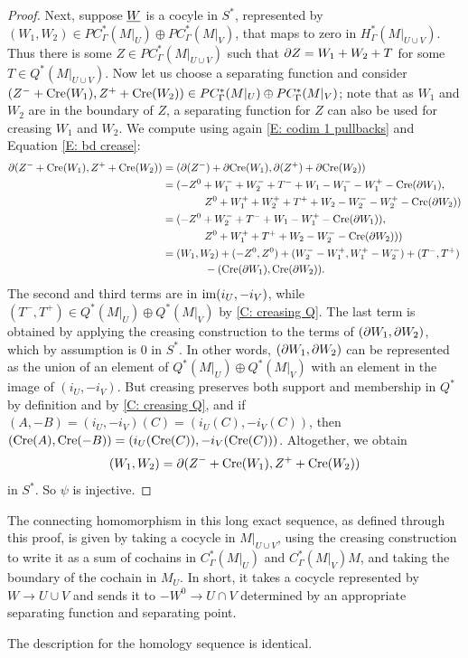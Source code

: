 \begin{proof}
Next, suppose $\underline{W}$ is a cocyle in $S^*$, represented by $(W_1,W_2)\in PC^*_\Gamma(M|_U)\oplus  PC^*_\Gamma(M|_V)$, that  maps to zero in $H_{\Gamma}^*(M|_{U \cup V})$.  Thus there is
some $Z\in PC^*_\Gamma(M|_{U\cup V})$ such that $\partial Z=W_1+W_2+T$ for some $T\in Q^*(M|_{U\cup V})$.
Now let us choose a separating function and consider $(Z^-+\mathrm{Cre}(W_1),Z^++\mathrm{Cre}(W_2))\in PC^*_\Gamma(M|_U)\oplus  PC^*_\Gamma(M|_V)$; note that as $W_1$ and $W_2$ are in the boundary of $Z$, a separating function for $Z$ can also be used for creasing $W_1$ and $W_2$. We compute using again \cref{E: codim 1 pullbacks} and Equation \eqref{E: bd crease}:
\begin{align*}
\partial (Z^-+\mathrm{Cre}(W_1),Z^++\mathrm{Cre}(W_2))&=(\partial (Z^-)+\partial \mathrm{Cre}(W_1),\partial (Z^+)+\partial\mathrm{Cre}(W_2))\\
&= (-Z^0 + W_1^- + W_2^- + T^-+W_1 -W_1^- -W_1^+ -\mathrm{Cre}(\partial W_1),\\
&\qquad\qquad Z^0+ W_1^++ W_2^+ + T^++W_2 -W_2^- -W_2^+ -\mathrm{Cre}(\partial W_2))\\
&= (-Z^0  + W_2^- + T^-+W_1  -W_1^+ -\mathrm{Cre}(\partial W_1)),\\
&\qquad\qquad Z^0+ W_1^+ + T^++W_2 -W_2^-  -\mathrm{Cre}(\partial W_2)))\\
&= (W_1,W_2)+ (-Z^0,Z^0)  + (W_2^--W_1^+, W_1^+ -W_2^-)   + (T^-,T^+)\\
&\qquad\qquad -(\mathrm{Cre}(\partial W_1),\mathrm{Cre}(\partial W_2)).
\end{align*}
The second and third terms are in $\text{im}(i_U,-i_V)$, while  $(T^-,T^+)\in Q^*(M|_U)\oplus Q^*(M|_V)$ by \cref{C: creasing Q}.
 The last term is obtained by applying the creasing construction to the terms of  $(\partial W_1,\partial W_2)$, which by assumption is $0$ in $S^*$. In other words, $(\partial W_1,\partial W_2)$ can be represented as the union of an element of $Q^*(M|_U)\oplus Q^*(M|_V)$ with an element in the image of $(i_U,-i_V)$. But creasing preserves both support and membership in $Q^*$ by definition and by \cref{C: creasing Q}, and  if $(A,-B)=(i_U,-i_V)(C)=(i_U(C),-i_V(C))$, then $(\mathrm{Cre}(A),\mathrm{Cre}(-B))=(i_U(\mathrm{Cre}(C)),-i_V(\mathrm{Cre}(C)))$. Altogether, we obtain $$(W_1,W_2)=\partial (Z^-+\mathrm{Cre}(W_1),Z^++\mathrm{Cre}(W_2))$$ in $S^*$. So  $\psi$ is injective.
\end{proof}

\begin{remark}\label{R: MV boundary}
The connecting homomorphism in this long exact sequence, as defined through this proof, is given by taking a cocycle in $M|_{U \cup V}$,
using the creasing construction to write it as a sum of cochains in $C^*_\Gamma(M|_{U})$ and $C^*_\Gamma(M|_{V})M$, and taking the boundary of the cochain in $M_U$.
In short, it takes a cocycle represented by $W\to U \cup V$ and sends it to $-W^0\to U\cap V$ determined by an appropriate separating function and separating point.

The description for the homology sequence is identical.
\end{remark}

